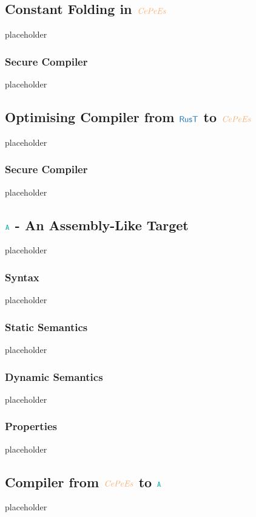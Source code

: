\documentclass[a4paper,12pt]{article}
\begin{document}
\subsection{Constant Folding in $\irl{CePeEs}$}\label{subsec-cf-in-cepees}
placeholder
\subsubsection{Secure Compiler}\label{subsec-cf-cepees-seccomp}
placeholder

\subsection{Optimising Compiler from $\src{RusT}$ to $\irl{CePeEs}$}\label{subsec-optimising-rust-to-cepees}
placeholder
\subsubsection{Secure Compiler}\label{subsec-optimising-rust-to-cepees-seccomp}
placeholder


\subsection{$\obj{A}$ - An Assembly-Like Target}\label{subsec-a}
placeholder
\subsubsection{Syntax}\label{subsec-a-syntax}
placeholder
\subsubsection{Static Semantics}\label{subsec-a-static}
placeholder
\subsubsection{Dynamic Semantics}\label{subsec-a-dynamic}
placeholder
\subsubsection{Properties}\label{subsec-a-properties}
placeholder


\subsection{Compiler from $\irl{CePeEs}$ to $\obj{A}$}\label{subsec-cepees-to-a}
placeholder
\end{document}
